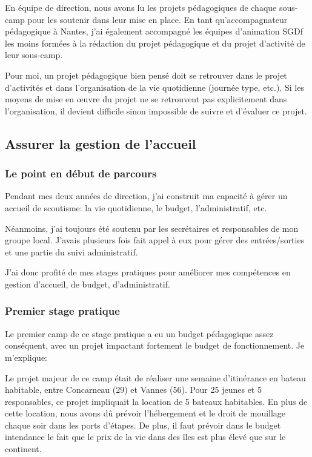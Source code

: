 \documentclass[titlepage,11pt,a4paper]{article}
\begin{document}
En équipe de direction, nous avons lu les projets pédagogiques de chaque sous-camp pour les
soutenir dans leur mise en place. En tant qu’accompagnateur pédagogique à Nantes, j'ai
également accompagné les équipes d'animation SGDf les moins formées à la rédaction du projet
pédagogique et du projet d'activité de leur sous-camp.

Pour moi, un projet pédagogique bien pensé doit se retrouver dans le projet d'activités et
dans l'organisation de la vie quotidienne (journée type, etc.). Si les moyens de mise en
œuvre du projet ne se retrouvent pas explicitement dans l'organisation, il devient
difficile sinon impossible de suivre et d'évaluer ce projet.

\subsection{Assurer la gestion de l'accueil}

\subsubsection{Le point en début de parcours}

Pendant mes deux années de direction, j'ai construit ma capacité à gérer un accueil de
scoutisme: la vie quotidienne, le budget, l'administratif, etc.

Néanmoins, j'ai toujours été soutenu par les secrétaires et responsables de mon groupe
local. J'avais plusieurs fois fait appel à eux pour gérer des entrées/sorties et une
partie du suivi administratif.

J'ai donc profité de mes stages pratiques pour améliorer mes compétences en gestion
d'accueil, de budget, d'administratif.

\subsubsection{Premier stage pratique}

Le premier camp de ce stage pratique a eu un budget pédagogique assez conséquent, avec un
projet impactant fortement le budget de fonctionnement. Je m'explique:

Le projet majeur de ce camp était de réaliser une semaine d’itinérance en bateau
habitable, entre Concarneau (29) et Vannes (56). Pour 25 jeunes et 5 responsables, ce
projet impliquait la location de 5 bateaux habitables. En plus de cette location, nous
avons dû prévoir l'hébergement et le droit de mouillage chaque soir dans les ports d'étapes.
De plus, il faut prévoir dans le budget intendance le fait que le prix de la vie dans des
îles est plus élevé que sur le continent. %
\end{document}
